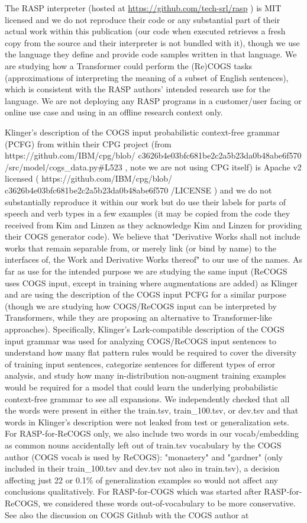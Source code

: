 \documentclass[11pt]{article}
\begin{document}
The RASP \cite{Weiss2021} interpreter (hosted at \href{https://github.com/tech-srl/rasp}{https://github.com/tech-srl/rasp} ) is MIT licensed and we do not reproduce their code or any substantial part of their actual work within this publication (our code when executed retrieves a fresh copy from the source and their interpreter is not bundled with it), though we use the language they define and provide code samples written in that language. We are studying how a Transformer could perform the (Re)COGS tasks (approximations of interpreting the meaning of a subset of English sentences), which is consistent with the RASP authors' intended research use for the language. We are not deploying any RASP programs in a customer/user facing or online use case and using in an offline research context only.
 
Klinger's description of the COGS input probabilistic context-free grammar (PCFG) from within their CPG project (from https://github.com/IBM/cpg/blob/
c3626b4e03bfc681be2c2a5b23da0b48abe6f570
/src/model/cogs\_data.py\#L523 , note we are not using CPG itself) is Apache v2 licensed ( https://github.com/IBM/cpg/blob/
c3626b4e03bfc681be2c2a5b23da0b48abe6f570
/LICENSE ) and we do not substantially reproduce it within our work but do use their labels for parts of speech and verb types in a few examples (it may be copied from the code they received from Kim and Linzen as they acknowledge Kim and Linzen for providing their COGS generator code). We believe that "Derivative Works shall not include works that remain separable from, or merely link (or bind by name) to the interfaces of, the Work and Derivative Works thereof" to our use of the names. As far as use for the intended purpose we are studying the same input (ReCOGS uses COGS input, except in training where augmentations are added) as Klinger and are using the description of the COGS input PCFG for a similar purpose (though we are studying how COGS/ReCOGS input can be interpreted by Transformers, while they are proposing an alternative to Transformer-like approaches). Specifically, Klinger's Lark-compatible description of the COGS input grammar was used for analyzing COGS/ReCOGS input sentences to understand how many flat pattern rules would be required to cover the diversity of training input sentences, categorize sentences for different types of error analysis, and study how many in-distribution non-augment training examples would be required for a model that could learn the underlying probabilistic context-free grammar to see all expansions. We independently checked that all the words were present in either the train.tsv, train\_100.tsv, or dev.tsv and that words in Klinger's description were not leaked from test or generalization sets. For RASP-for-ReCOGS only, we also include two words in our vocab/embedding as common nouns accidentally left out of train.tsv vocabulary by the COGS author (COGS vocab is used by ReCOGS): "monastery" and "gardner" (only included in their train\_100.tsv and dev.tsv not also in train.tsv), a decision affecting just 22 or 0.1\% of generalization examples so would not affect any conclusions qualitatively. For RASP-for-COGS which was started after RASP-for-ReCOGS, we considered these words out-of-vocabulary to be more conservative. See also the discussion on COGS Github with the COGS author at 
\end{document}
